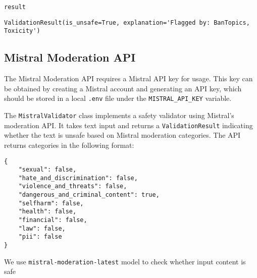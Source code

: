 \begin{verbatim}
result
\end{verbatim}

\begin{verbatim}
ValidationResult(is_unsafe=True, explanation='Flagged by: BanTopics, Toxicity')
\end{verbatim}


\subsection{Mistral Moderation API}

The Mistral Moderation API requires a Mistral API key for usage. This key can be obtained by creating a Mistral account and generating an API key, which should be stored in a local \texttt{.env} file under the \texttt{MISTRAL\_API\_KEY} variable.

The \texttt{MistralValidator} class implements a safety validator using Mistral's moderation API. It takes text input and returns a \texttt{ValidationResult} indicating whether the text is unsafe based on Mistral moderation categories. The API returns categories in the following format:

\begin{verbatim}
{
    "sexual": false,
    "hate_and_discrimination": false,
    "violence_and_threats": false,
    "dangerous_and_criminal_content": true,
    "selfharm": false,
    "health": false,
    "financial": false,
    "law": false,
    "pii": false
}
\end{verbatim}

We use \texttt{mistral-moderation-latest} model to check whether input content is safe~

